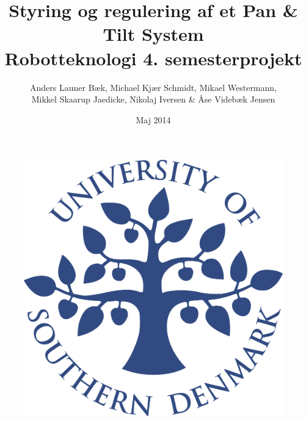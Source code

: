 \title{Styring og regulering af et Pan \& Tilt System \\Robotteknologi 4. semesterprojekt}
\author{Anders Launer Bæk, Michael Kjær Schmidt, Mikael Westermann, \\Mikkel Skaarup Jaedicke, Nikolaj Iversen \& Åse Videbæk Jensen}
\date{Maj 2014}
\begin{figure}
\centering
\includegraphics[width=1\textwidth]{graphics/forside.png}
\end{figure}
\maketitle

